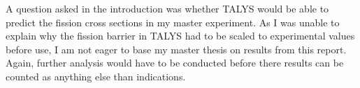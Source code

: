 \documentclass[]{article}
\begin{document}
A question asked in the introduction was whether TALYS would be able to predict the fission cross sections in my master experiment. As I was unable to explain why the fission barrier in TALYS had to be scaled to experimental values before use, I am not eager to base my master thesis on results from this report. Again, further analysis would have to be conducted before there results can be counted as anything else than indications. 



 
\end{document}
